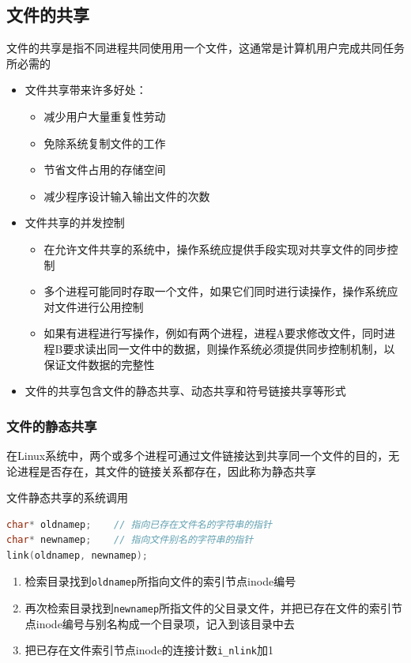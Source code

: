 \documentclass[cs4size,a4paper,10pt]{ctexart}
\begin{document}
	\subsection{文件的共享}
	文件的共享是指不同进程共同使用用一个文件，这通常是计算机用户完成共同任务所必需的
	\begin{itemize}
		\item 文件共享带来许多好处：
		\begin{itemize}
			\item 减少用户大量重复性劳动
			\item 免除系统复制文件的工作
			\item 节省文件占用的存储空间
			\item 减少程序设计输入输出文件的次数
		\end{itemize}
		\item 文件共享的并发控制
		\begin{itemize}
			\item 在允许文件共享的系统中，操作系统应提供手段实现对共享文件的同步控制
			\item 多个进程可能同时存取一个文件，如果它们同时进行读操作，操作系统应对文件进行公用控制
			\item 如果有进程进行写操作，例如有两个进程，进程A要求修改文件，同时进程B要求读出同一文件中的数据，则操作系统必须提供同步控制机制，以保证文件数据的完整性
		\end{itemize}
		\item 文件的共享包含文件的静态共享、动态共享和符号链接共享等形式
	\end{itemize}

	\subsubsection{文件的静态共享}
	在Linux系统中，两个或多个进程可通过文件链接达到共享同一个文件的目的，无论进程是否存在，其文件的链接关系都存在，因此称为静态共享

	文件静态共享的系统调用
	\begin{lstlisting}[language=C,
		keywordstyle=\color{black}
	]
char* oldnamep;    // 指向已存在文件名的字符串的指针
char* newnamep;    // 指向文件别名的字符串的指针
link(oldnamep, newnamep);		
	\end{lstlisting}

	\begin{enumerate}[label=\arabic*.]
		\item 检索目录找到\verb|oldnamep|所指向文件的索引节点inode编号
		\item 再次检索目录找到\verb|newnamep|所指文件的父目录文件，并把已存在文件的索引节点inode编号与别名构成一个目录项，记入到该目录中去
		\item 把已存在文件索引节点inode的连接计数\verb|i_nlink|加1
	\end{enumerate}
\end{document}
